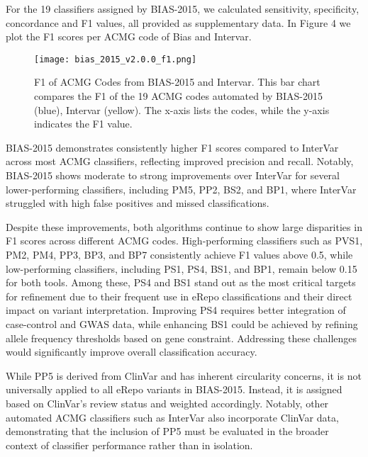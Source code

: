 \documentclass[unnumsec,webpdf,contemporary,large]{oup-authoring-template}
\theoremstyle{thmstyleone}
\theoremstyle{thmstyletwo}
\theoremstyle{thmstylethree}
\begin{document}
For the 19 classifiers assigned by BIAS-2015, we calculated sensitivity, specificity, concordance and F1 values, all provided as supplementary data. In Figure 4 we plot the F1 scores per ACMG code of Bias and Intervar.

\begin{figure}[!ht]
\centering
\texttt{[image: bias\_2015\_v2.0.0\_f1.png]}
\caption{F1 of ACMG Codes from BIAS-2015 and Intervar. This bar chart compares the F1 of the 19 ACMG codes automated by BIAS-2015 (blue), Intervar (yellow). The x-axis lists the codes, while the y-axis indicates the F1 value.}
\label{fig:f1_chart}
\end{figure}

BIAS-2015 demonstrates consistently higher F1 scores compared to InterVar across most ACMG classifiers, reflecting improved precision and recall. Notably, BIAS-2015 shows moderate to strong improvements over InterVar for several lower-performing classifiers, including PM5, PP2, BS2, and BP1, where InterVar struggled with high false positives and missed classifications.

Despite these improvements, both algorithms continue to show large disparities in F1 scores across different ACMG codes. High-performing classifiers such as PVS1, PM2, PM4, PP3, BP3, and BP7 consistently achieve F1 values above 0.5, while low-performing classifiers, including PS1, PS4, BS1, and BP1, remain below 0.15 for both tools. Among these, PS4 and BS1 stand out as the most critical targets for refinement due to their frequent use in eRepo classifications and their direct impact on variant interpretation. Improving PS4 requires better integration of case-control and GWAS data, while enhancing BS1 could be achieved by refining allele frequency thresholds based on gene constraint. Addressing these challenges would significantly improve overall classification accuracy.

While PP5 is derived from ClinVar and has inherent circularity concerns, it is not universally applied to all eRepo variants in BIAS-2015. Instead, it is assigned based on ClinVar’s review status and weighted accordingly. Notably, other automated ACMG classifiers such as InterVar also incorporate ClinVar data, demonstrating that the inclusion of PP5 must be evaluated in the broader context of classifier performance rather than in isolation.
\end{document}
